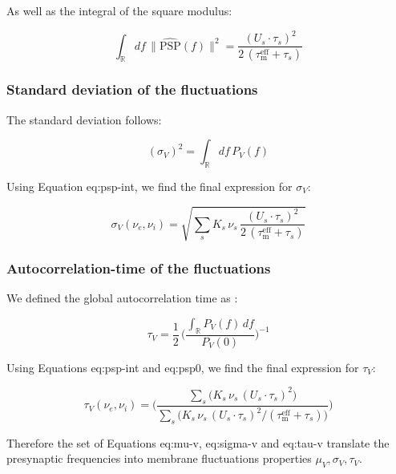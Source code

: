 \documentclass[8pt, colorlinks, a4paper]{article}
\renewcommand\ref{}
\begin{document}
As well as the integral of the square modulus:

\begin{equation}
  \label{eq:psp-int}
  \int_\mathbb{R}  df \, \| \hat{\mathrm{PSP}}(f) \|^2 = \frac{(U_s \cdot \tau_s)^2}{2 \, (\tau_\mathrm{m}^\mathrm{eff} + \tau_s ) }
\end{equation}

\subsubsection{Standard deviation of the fluctuations}
\label{sec-3-5-4}

The standard deviation follows:

\begin{equation}
  (\sigma_V)^2  = \int_\mathbb{R}  df \, P_V(f)
\end{equation}

Using Equation \ref{eq:psp-int}, we find the final expression for
\(\sigma_V\):

\begin{equation}
  \label{eq:sigma-v}
  \sigma_V(\nu_e, \nu_i)  = \sqrt{ \sum_s K_s \, \nu_s \, \frac{(U_s \cdot \tau_s)^2}{2 \, (\tau_\mathrm{m}^\mathrm{eff} + \tau_s ) } }
\end{equation}

\subsubsection{Autocorrelation-time of the fluctuations}
\label{sec-3-5-5}

We defined the global autocorrelation time as \cite{Zerlaut2016}:

\begin{equation}
  \tau_V = \frac{1}{2} \, \big( \frac{\int_\mathbb{R} P_V(f) \, d f}{ P_V(0) } \big)^{-1}
\end{equation}

Using Equations \ref{eq:psp-int} and \ref{eq:psp0}, we find the final
expression for \(\tau_V\):

\begin{equation}
  \label{eq:tau-v}
  \tau_V(\nu_e, \nu_i) = \Big( \frac{
    \sum_s \big( K_s \, \nu_s \, (U_s \cdot \tau_s)^2\big) 
  }{
    \sum_s \big( K_s \, \nu_s \, (U_s \cdot \tau_s)^2 /(\tau_\mathrm{m}^\mathrm{eff} + \tau_s ) \big)
  } \Big)
\end{equation}

Therefore the set of Equations \ref{eq:mu-v}, \ref{eq:sigma-v} and
\ref{eq:tau-v} translate the presynaptic frequencies into membrane
fluctuations properties \(\mu_V, \sigma_V, \tau_V\).
\end{document}
